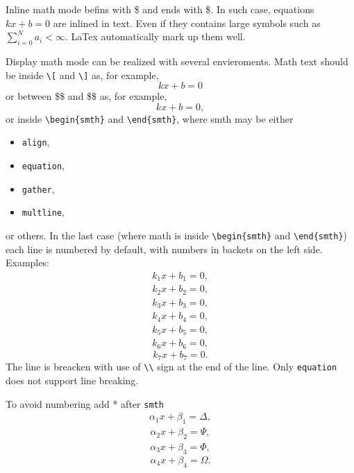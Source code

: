 \documentclass{article}
\begin{document}
Inline math mode befins with \$ and ends with \$. In such case, equations $kx+b=0$ are inlined in text. Even if they contains large symbols such as $\sum\limits_{i=0}^{N}a_i<\infty.$ LaTex automatically mark up them well. 

Display math mode can be realized with several envieroments. Math text should be inside \verb|\[| and \verb|\]| as, for example, \[kx+b=0\] or between \$\$ and \$\$ as, for example, $$kx+b=0,$$ or inside \verb|\begin{smth}| and \verb|\end{smth}|, where smth may be either
\begin{itemize}
    \item \verb|align|,
    \item \verb|equation|,
    \item \verb|gather|,
    \item \verb|multline|, 
\end{itemize}
or others. In the last case (where math is inside \verb|\begin{smth}| and \verb|\end{smth}|) each line is numbered by default, with numbers in backets on the left side. Examples:
\begin{align}
    k_1x+b_1=0, \\
    k_2x+b_2=0,
\end{align}
\begin{gather}
    k_3x+b_3=0, \\
    k_4x+b_4=0,
\end{gather}
\begin{multline}
    k_5x+b_5=0, \\
    k_6x+b_6=0,
\end{multline}
\begin{equation}
    k_7x+b_7=0.
\end{equation}
The line is breacken with use of \verb|\\| sign at the end of the line. Only \verb|equation| does not support line breaking. 


To avoid numbering add * after \verb|smth| 
\begin{align*}
    \alpha_1x+\beta_1=\Delta, 
\end{align*}
\begin{gather*}
    \alpha_2x+\beta_2=\Psi, 
\end{gather*}
\begin{multline*}
    \alpha_3x+\beta_3=\Phi,  
\end{multline*}
\begin{equation*}
    \alpha_4x+\beta_4=\Omega.
\end{equation*}
\end{document}
